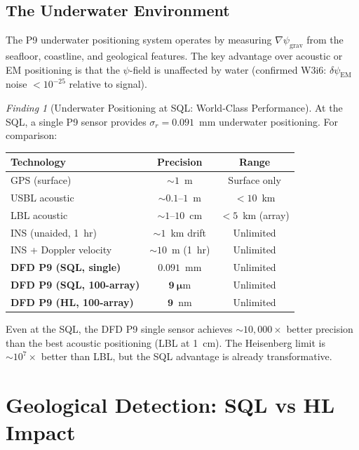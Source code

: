 \documentclass[11pt]{article}
\theoremstyle{definition}
\theoremstyle{remark}
\newtheorem{finding}[theorem]{Finding}
\newcommand{\psigrav}{\psi_{\mathrm{grav}}}
\newcommand{\dpsiem}{\delta\psi_{\mathrm{EM}}}
\begin{document}
\subsection{The Underwater Environment}

The P9 underwater positioning system operates by measuring $\nabla\psigrav$
from the seafloor, coastline, and geological features. The key advantage
over acoustic or EM positioning is that the $\psi$-field is unaffected by
water (confirmed W3i6: $\dpsiem$ noise $< 10^{-25}$ relative to signal).

\begin{finding}[Underwater Positioning at SQL: World-Class Performance]
\label{find:P9-underwater-SQL}
At the SQL, a single P9 sensor provides $\sigma_r = 0.091$~mm underwater
positioning. For comparison:

\begin{center}
\begin{tabular}{@{}lcc@{}}
\toprule
Technology & Precision & Range \\
\midrule
GPS (surface) & $\sim 1$~m & Surface only \\
USBL acoustic & $\sim 0.1$--$1$~m & $< 10$~km \\
LBL acoustic & $\sim 1$--$10$~cm & $< 5$~km (array) \\
INS (unaided, 1~hr) & $\sim 1$~km drift & Unlimited \\
INS + Doppler velocity & $\sim 10$~m (1~hr) & Unlimited \\
\textbf{DFD P9 (SQL, single)} & $\mathbf{0.091}$~mm & Unlimited \\
\textbf{DFD P9 (SQL, 100-array)} & $\mathbf{9~\mu}$m & Unlimited \\
\textbf{DFD P9 (HL, 100-array)} & $\mathbf{9}$~nm & Unlimited \\
\bottomrule
\end{tabular}
\end{center}

Even at the SQL, the DFD P9 single sensor achieves $\sim 10{,}000\times$
better precision than the best acoustic positioning (LBL at 1~cm). The
Heisenberg limit is $\sim 10^7\times$ better than LBL, but the SQL
advantage is already transformative.
\end{finding}

\section{Geological Detection: SQL vs HL Impact}
\label{sec:P9-geo-SQL}
\end{document}
